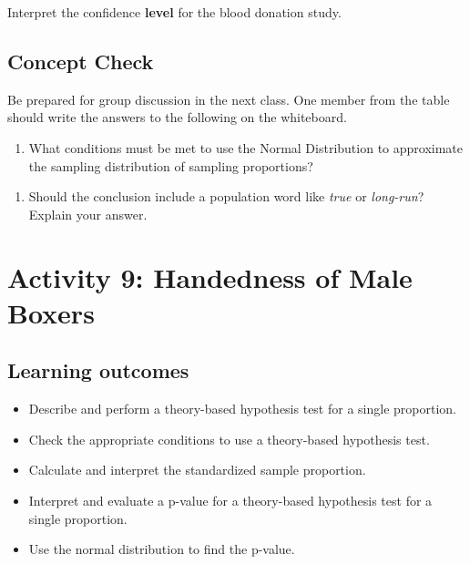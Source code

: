 \documentclass[
]{report}
\providecommand{\tightlist}{%
  \setlength{\itemsep}{0pt}\setlength{\parskip}{0pt}}
\begin{document}

Interpret the confidence \textbf{level} for the blood donation study.

\vspace{0.5in}

\newpage

\subsection{Concept Check}\label{concept-check-4}

Be prepared for group discussion in the next class. One member from the table should write the answers to the following on the whiteboard.

\begin{enumerate}
\def\labelenumi{\arabic{enumi}.}
\tightlist
\item
  What conditions must be met to use the Normal Distribution to approximate the sampling distribution of sampling proportions?
\end{enumerate}

\vspace{0.6in}

\begin{enumerate}
\def\labelenumi{\arabic{enumi}.}
\setcounter{enumi}{1}
\tightlist
\item
  Should the conclusion include a population word like \emph{true} or \emph{long-run}? Explain your answer.
\end{enumerate}

\vspace{0.6in}

\newpage

\section{Activity 9: Handedness of Male Boxers}\label{activity-9-handedness-of-male-boxers}


\subsection{Learning outcomes}\label{learning-outcomes-8}

\begin{itemize}
\item
  Describe and perform a theory-based hypothesis test for a single proportion.
\item
  Check the appropriate conditions to use a theory-based hypothesis test.
\item
  Calculate and interpret the standardized sample proportion.
\item
  Interpret and evaluate a p-value for a theory-based hypothesis test for a single proportion.
\item
  Use the normal distribution to find the p-value.
\end{itemize}
\end{document}
